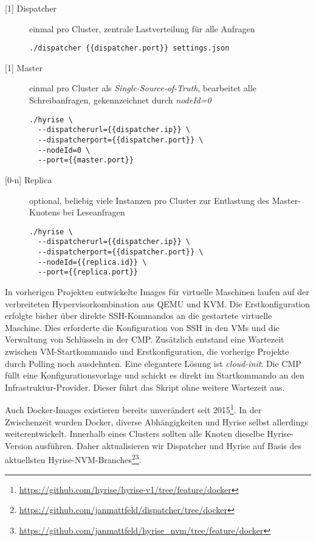 \newpage
\begin{description}
	
\item[{[1]} Dispatcher] einmal pro Cluster, zentrale Lastverteilung für alle Anfragen
	
\begin{verbatim}
./dispatcher {{dispatcher.port}} settings.json
\end{verbatim}
	
\item[{[1]} Master] einmal pro Cluster als \emph{Single-Source-of-Truth}, bearbeitet alle Schreibanfragen, gekennzeichnet durch \emph{nodeId=0}
	
\begin{verbatim}
./hyrise \
  --dispatcherurl={{dispatcher.ip}} \
  --dispatcherport={{dispatcher.port}} \
  --nodeId=0 \
  --port={{master.port}}
\end{verbatim}

\item[{[0-n]} Replica] optional, beliebig viele Instanzen pro Cluster zur Entlastung des Master-Knotens bei Leseanfragen

\begin{verbatim}
./hyrise \
  --dispatcherurl={{dispatcher.ip}} \
  --dispatcherport={{dispatcher.port}} \
  --nodeId={{replica.id}} \
  --port={{replica.port}}
\end{verbatim}
	
\end{description}

In vorherigen Projekten entwickelte Images für virtuelle Maschinen laufen auf der verbreiteten Hypervisorkombination aus QEMU und KVM. Die Erstkonfiguration erfolgte bisher über direkte SSH-Kommandos an die gestartete virtuelle Maschine. Dies erforderte die Konfiguration von SSH in den VMs und die Verwaltung von Schlüsseln in der CMP. Zusätzlich entstand eine Wartezeit zwischen VM-Startkommando und Erstkonfiguration, die vorherige Projekte durch Polling noch ausdehnten. Eine elegantere Lösung ist \emph{cloud-init}: Die CMP füllt eine Konfigurationsvorlage und schickt es direkt im Startkommando an den Infrastruktur-Provider. Dieser führt das Skript ohne weitere Wartezeit aus.

Auch Docker-Images existieren bereits unverändert seit 2015\footnote{\url{https://github.com/hyrise/hyrise-v1/tree/feature/docker}}. In der Zwischenzeit wurden Docker, diverse Abhängigkeiten und Hyrise selbst allerdings weiterentwickelt. Innerhalb eines Clusters sollten alle Knoten dieselbe Hyrise-Version ausführen. Daher aktualisieren wir Dispatcher und Hyrise auf Basis des aktuellsten Hyrise-NVM-Branches\footnote{\url{https://github.com/janmattfeld/dispatcher/tree/docker}}\footnote{\url{https://github.com/janmattfeld/hyrise_nvm/tree/feature/docker}}.

